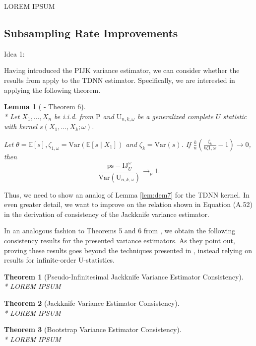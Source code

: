 \documentclass[letterpaper,10pt]{article}
\numberwithin{equation}{section}
\newtheorem{thm}{Theorem}
\numberwithin{thm}{section}
\newtheorem{lem}{Lemma}
\numberwithin{lem}{section}
\numberwithin{cor}{section}
\newcommand{\E}{\mathbb{E}}
\newcommand{\1}{\mathbbm{1}}
\newcommand{\Var}{\text{Var}}
\begin{document}
{\color{red} LOREM IPSUM}

\subsection{Subsampling Rate Improvements}

{\color{red} Idea 1:}

Having introduced the PIJK variance estimator, we can consider whether the results from \citet{peng_bias_2021} apply to the TDNN estimator.
Specifically, we are interested in applying the following theorem.

\begin{lem}[\citet{peng_bias_2021} - Theorem 6]\label{thm:peng21_6}\mbox{}\\*
	Let $X_1, \ldots, X_n$ be i.i.d. from $\mathrm{P}$ and $\mathrm{U}_{n, k, \omega}$ be a generalized complete $U$ statistic with kernel $s\left(X_1, \ldots, X_k ; \omega\right)$.

	Let $\theta=\E[s], \zeta_{1, \omega}=\Var\left(\E\left[s \mid X_1\right]\right)$ and $\zeta_k=\Var(s)$.
	If $\frac{k}{n}\left(\frac{\zeta_k}{k \zeta 1, \omega}-1\right) \rightarrow 0$, then
	\begin{equation}
		\frac{\mathrm{ps-IJ}_{U}^\omega}{\Var\left(\mathrm{U}_{n, k, \omega}\right)}
		\longrightarrow_{p} 1 .
	\end{equation}
\end{lem}

Thus, we need to show an analog of Lemma \ref{lem:dem7} for the TDNN kernel.
	{\color{red} In even greater detail, we want to improve on the relation shown in Equation (A.52) in the derivation of consistency of the Jackknife variance estimator.}

In an analogous fashion to Theorems 5 and 6 from \citet{demirkaya_optimal_2024}, we obtain the following consistency results for the presented variance estimators.
As they point out, proving these results goes beyond the techniques presented in \citet{arvesen_jackknifing_1969}, instead relying on results for infinite-order U-statistics.

{\color{red}
\begin{thm}[Pseudo-Infinitesimal Jackknife Variance Estimator Consistency]\label{PI_JK_Cons}\mbox{}\\*
	LOREM IPSUM
\end{thm}

\begin{thm}[Jackknife Variance Estimator Consistency]\label{JK_Cons}\mbox{}\\*
	LOREM IPSUM
\end{thm}

\begin{thm}[Bootstrap Variance Estimator Consistency]\label{BS_Cons}\mbox{}\\*
	LOREM IPSUM
\end{thm}
}
\end{document}
